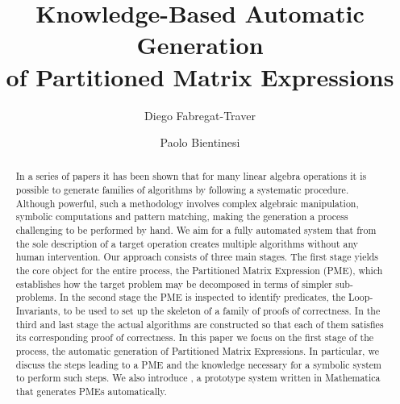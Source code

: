 \documentclass{llncs}
\newcommand{\click}{{\sc{Cl\makebox[.58\width][c]{1}ck}}}
\begin{document}
\title{Knowledge-Based Automatic Generation\\of Partitioned Matrix Expressions}

\author{Diego Fabregat-Traver \and 
        Paolo Bientinesi}


 
\aicescoverpage

\maketitle

\begin{abstract}

In a series of papers it has been shown that for many linear algebra
operations it is possible to generate families of algorithms by following
a systematic procedure.
Although powerful, such a methodology
involves complex algebraic manipulation, symbolic computations and
pattern matching, making the generation a process challenging to be
performed by hand.  We aim for a fully automated system that from the
sole description of a target operation creates multiple algorithms
without any human intervention.
Our approach consists of three main stages. The first stage yields the
core object for the entire process, the Partitioned Matrix Expression
(PME), which establishes how the target problem may be decomposed in
terms of simpler sub-problems.  In the second stage the PME is
inspected to identify predicates, the Loop-Invariants, to be used to
set up the skeleton of a family of proofs of correctness. In the third
and last stage the actual algorithms are constructed so that each of
them satisfies its corresponding proof of correctness.  In this paper
we focus on the first stage of the process, the automatic generation
of Partitioned Matrix Expressions. In particular, we discuss the steps
leading to a PME and the knowledge necessary for a symbolic system to
perform such steps. We also introduce \click{}, a prototype system
written in Mathematica that generates PMEs automatically.

\end{abstract}
\end{document}
